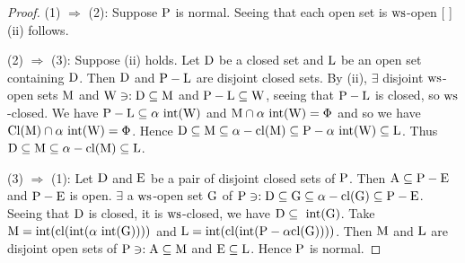 \begin{proof}
(1) $\Rightarrow$ (2): Suppose $\mathrm{P}$ is normal. Seeing that each open set is $\mathrm{ws}$-open [ ] (ii) follows.

(2) $\Rightarrow$ (3): Suppose (ii) holds. Let $\mathrm{D}$ be a closed set and $\mathrm{L}$ be an open set containing $\mathrm{D}$. Then $\mathrm{D}$ and $\mathrm{P} -\mathrm{L}$ are disjoint closed sets. By (ii), $\exists$  disjoint $\mathrm{ws}$-open sets $\mathrm{M}$ and $\mathrm{W} \ni: \mathrm{D}\subseteq \mathrm{M}$ and $\mathrm{P}-\mathrm{L} \subseteq \mathrm{W}$, seeing that $\mathrm{P} -\mathrm{L}$ is closed, so $\mathrm{ws}$-closed. We have $\mathrm{P} -\mathrm{L} \subseteq \alpha\text{ int} (\mathrm{W})$ and $\mathrm{M} \cap \alpha\text{ int} (\mathrm{W}) = \Phi$ and so we have $\mathrm{Cl} (\mathrm{M}) \cap \alpha\text{ int} (\mathrm{W}) = \Phi$. Hence $\mathrm{D} \subseteq \mathrm{M} \subseteq \alpha-\mathrm{cl}(\mathrm{M}) \subseteq \mathrm{P} -\alpha\text{ int}(\mathrm{W}) \subseteq \mathrm{L}$. Thus $\mathrm{D}\subseteq\mathrm{M} \subseteq \alpha-\mathrm{cl} (\mathrm{M}) \subseteq \mathrm{L}$.

(3) $\Rightarrow$ (1): Let $\mathrm{D}$ and $\mathrm{E}$ be a pair of disjoint closed sets of $\mathrm{P}$. Then $\mathrm{A} \subseteq \mathrm{P}-\mathrm{E}$ and $\mathrm{P}-\mathrm{E}$ is open. $\exists$ a $\mathrm{ws}$-open set $\mathrm{G}$ of $\mathrm{P} \ni: \mathrm{D} \subseteq \mathrm{G} \subseteq \alpha-\mathrm{cl} (\mathrm{G}) \subseteq \mathrm{P}-\mathrm{E}$. Seeing that $\mathrm{D}$ is closed, it is $\mathrm{ws}$-closed, we have $\mathrm{D} \subseteq \text{ int} (\mathrm{G})$. Take $\mathrm{M} =\text{int} (\mathrm{cl} (\text{int} (\alpha\text{ int} (\mathrm{G}))))$ and $\mathrm{L} = \text{int} (\mathrm{cl} (\text{int}(\mathrm{P}-\alpha\mathrm{cl} (\mathrm{G}))))$. Then $\mathrm{M}$ and $\mathrm{L}$ are disjoint open sets of $\mathrm{P} \ni: \mathrm{A} \subseteq \mathrm{M}$ and $\mathrm{E} \subseteq \mathrm{L}$. Hence $\mathrm{P}$ is normal.
\end{proof}
